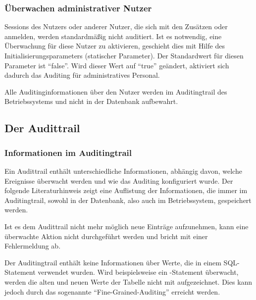         \subsubsection{Überwachen administrativer Nutzer}
          Sessions des Nutzers  oder anderer Nutzer, die sich
          mit den Zusätzen  oder
           anmelden, werden standardmäßig
          nicht auditiert. Ist es notwendig, eine Überwachung für diese
          Nutzer zu aktivieren, geschieht dies mit Hilfe des
          Initialisierungsparameters 
          (statischer Parameter). Der Standardwert für diesen Parameter ist
          \enquote{false}. Wird dieser Wert auf \enquote{true} geändert,
          aktiviert sich dadurch das Auditing für administratives Personal.
          \begin{merke}
            Alle Auditinginformationen über den Nutzer  werden im Auditingtrail des Betriebssystems und nicht in der Datenbank aufbewahrt.
          \end{merke}
      \subsection{Der Audittrail}
        \subsubsection{Informationen im Auditingtrail}
          Ein Audittrail enthält unterschiedliche Informationen, abhängig davon, welche Ereignisse überwacht werden und wie das Auditing konfiguriert wurde. Der folgende Literaturhinweis zeigt eine Auflistung der Informationen, die immer im Auditingtrail, sowohl in der Datenbank, also auch im Betriebssystem, gespeichert werden.

          \begin{literaturinternet}
            \item \cite{BCGIDBFI}
          \end{literaturinternet}

          Ist es dem Audittrail nicht mehr möglich neue Einträge aufzunehmen, kann eine überwachte Aktion nicht durchgeführt werden und bricht mit einer Fehlermeldung ab.

          Der Auditingtrail enthält keine Informationen über Werte, die in einem SQL-Statement verwendet wurden. Wird beispielsweise ein -Statement überwacht, werden die alten und neuen Werte der Tabelle nicht mit aufgezeichnet. Dies kann jedoch durch das sogenannte \enquote{Fine-Grained-Auditing} erreicht werden.
